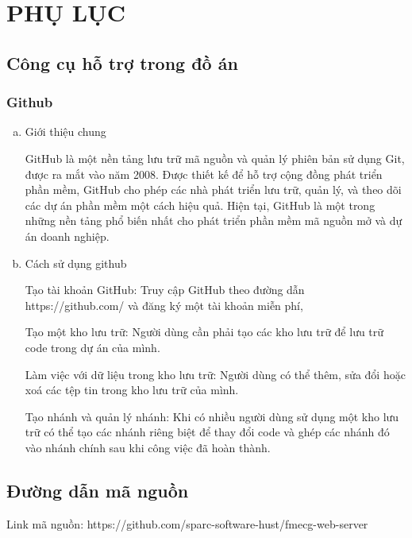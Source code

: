 
\section*{PHỤ LỤC}


\subsection*{Công cụ hỗ trợ trong đồ án}

\subsubsection*{Github}

\begin{enumerate}[a)]
  \item Giới thiệu chung
  
  GitHub là một nền tảng lưu trữ mã nguồn và quản lý phiên bản sử dụng Git, được ra mắt vào năm 2008. Được thiết kế để hỗ trợ cộng đồng phát triển phần mềm, GitHub cho phép các nhà phát triển lưu trữ, quản lý, và theo dõi các dự án phần mềm một cách hiệu quả. Hiện tại, GitHub là một trong những nền tảng phổ biến nhất cho phát triển phần mềm mã nguồn mở và dự án doanh nghiệp.\cite{github}
  
  \item Cách sử dụng github
  
  Tạo tài khoản GitHub: Truy cập GitHub theo đường dẫn https://github.com/ và đăng ký một tài khoản miễn phí, 

Tạo một kho lưu trữ: Người dùng cần phải tạo các kho lưu trữ để lưu trữ code trong dự án của mình.

Làm việc với dữ liệu trong kho lưu trữ: Người dùng có thể thêm, sửa đổi hoặc xoá các tệp tin trong kho lưu trữ của mình.

Tạo nhánh và quản lý nhánh: Khi có nhiều người dùng sử dụng một kho lưu trữ có thể tạo các nhánh riêng biệt để thay đổi code và ghép các nhánh đó vào nhánh chính sau khi công việc đã hoàn thành.
\end{enumerate}

\subsection*{Đường dẫn mã nguồn}

Link mã nguồn: https://github.com/sparc-software-hust/fmecg-web-server

\clearpage